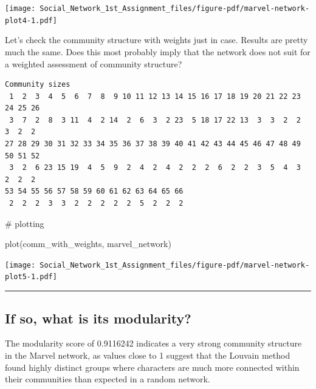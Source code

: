 \documentclass[
  letterpaper,
  DIV=11,
  numbers=noendperiod]{scrartcl}
\newenvironment{Shaded}{\begin{snugshade}}{\end{snugshade}}
\newcommand{\AttributeTok}[1]{\textcolor[rgb]{0.40,0.45,0.13}{#1}}
\newcommand{\CommentTok}[1]{\textcolor[rgb]{0.37,0.37,0.37}{#1}}
\newcommand{\FunctionTok}[1]{\textcolor[rgb]{0.28,0.35,0.67}{#1}}
\newcommand{\NormalTok}[1]{\textcolor[rgb]{0.00,0.23,0.31}{#1}}
\newcommand{\OtherTok}[1]{\textcolor[rgb]{0.00,0.23,0.31}{#1}}
\newcommand{\SpecialCharTok}[1]{\textcolor[rgb]{0.37,0.37,0.37}{#1}}
\begin{document}
\texttt{[image: Social\_Network\_1st\_Assignment\_files/figure-pdf/marvel-network-plot4-1.pdf]}

Let's check the community structure with weights just in case. Results
are pretty much the same. Does this most probably imply that the network
does not suit for a weighted assessment of community structure?

\begin{Shaded}
\end{Shaded}

\begin{verbatim}
Community sizes
 1  2  3  4  5  6  7  8  9 10 11 12 13 14 15 16 17 18 19 20 21 22 23 24 25 26 
 3  7  2  8  3 11  4  2 14  2  6  3  2 23  5 18 17 22 13  3  3  2  2  3  2  2 
27 28 29 30 31 32 33 34 35 36 37 38 39 40 41 42 43 44 45 46 47 48 49 50 51 52 
 3  2  6 23 15 19  4  5  9  2  4  2  4  2  2  2  6  2  2  3  5  4  3  2  2  2 
53 54 55 56 57 58 59 60 61 62 63 64 65 66 
 2  2  2  3  3  2  2  2  2  2  5  2  2  2 
\end{verbatim}

\begin{Shaded}
\begin{Highlighting}[]
\CommentTok{\# plotting}

\FunctionTok{plot}\NormalTok{(comm\_with\_weights, marvel\_network)}
\end{Highlighting}
\end{Shaded}

\texttt{[image: Social\_Network\_1st\_Assignment\_files/figure-pdf/marvel-network-plot5-1.pdf]}

\begin{center}\rule{0.5\linewidth}{0.5pt}\end{center}

\subsection{If so, what is its
modularity?}\label{if-so-what-is-its-modularity}

The modularity score of 0.9116242 indicates a very strong community
structure in the Marvel network, as values close to 1 suggest that the
Louvain method found highly distinct groups where characters are much
more connected within their communities than expected in a random
network.
\end{document}
